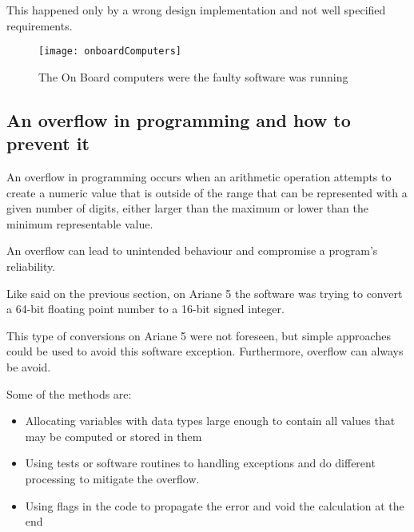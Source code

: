\documentclass[
12pt, %
a4paper, %
oneside, %
headinclude,footinclude, %
BCOR5mm, %
]{scrartcl}
\begin{document}
This happened only by a wrong design implementation and not well specified requirements.

\begin{figure}[tb]
	\centering 
	\texttt{[image: onboardComputers]} 
	\caption[The On Board computers]{The On Board computers were the faulty software was running \cite{hownottocode:2016}} %
	\label{fig:onboardcomputers} 
\end{figure}


\subsection{An overflow in programming and how to prevent it}

An overflow in programming \cite{integeroverflow:wikipedia} occurs when an arithmetic operation attempts to  create a numeric value that is outside of the range that can be represented with a given number of digits, either larger than the maximum or lower than the minimum representable value.

An overflow can lead to unintended behaviour and compromise a program's reliability.

Like said on the previous section, on Ariane 5 the software was trying to convert a 64-bit floating point number to a 16-bit signed integer.

This type of conversions on Ariane 5 were not foreseen, but simple approaches could be used to avoid this software exception. Furthermore, overflow can always be avoid. 

Some of the methods are:

\begin{itemize}[noitemsep] %
	\item Allocating variables with data types large enough to contain all values that may be computed or stored in them
	\item Using tests or software routines to handling exceptions and do different processing to mitigate the overflow.
	\item Using flags in the code to propagate the error and void the calculation at the end
\end{itemize}

\end{document}
